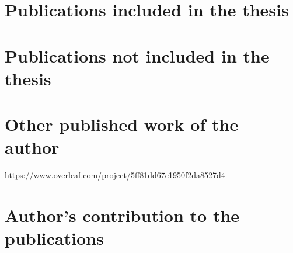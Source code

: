 


\nocite{*} %
\newrefcontext[sorting=none] %

\section*{Publications included in the thesis}
\printbibliography[keyword={included},heading=none,env=roman-numerals]

\section*{Publications not included in the thesis}
\printbibliography[keyword={excluded},heading=none,env=roman-numerals,resetnumbers=false] 
    
\section*{Other published work of the author}
\printbibliography[keyword={other}, heading=none,env=roman-numerals,resetnumbers=false]
https://www.overleaf.com/project/5ff81dd67c1950f2da8527d4

\section*{Author’s contribution to the publications}